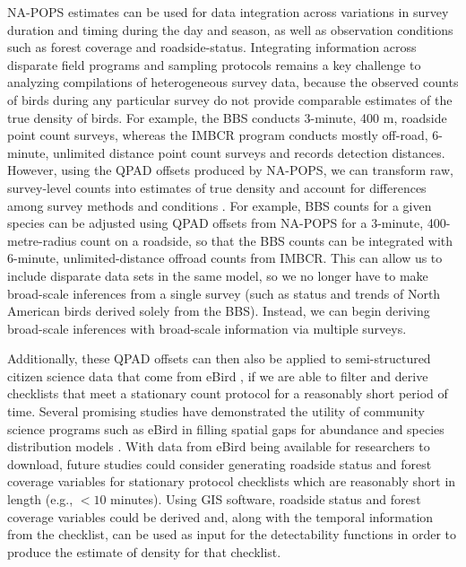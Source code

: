\par NA-POPS estimates can be used for data integration across variations in survey duration and timing during the day and season, as well as observation conditions such as forest coverage and roadside-status.
Integrating information across disparate field programs and sampling protocols remains a key challenge to analyzing compilations of heterogeneous survey data, because the observed counts of birds during any particular survey do not provide comparable estimates of the true density of birds.
For example, the BBS conducts 3-minute, 400 m, roadside point count surveys, whereas the IMBCR program conducts mostly off-road, 6-minute, unlimited distance point count surveys and records detection distances.
However, using the QPAD offsets produced by NA-POPS, we can transform raw, survey-level counts into estimates of true density and account for differences among survey methods and conditions \citep{stralberg_projecting_2015, solymos_lessons_2020}.
For example, BBS counts for a given species can be adjusted using QPAD offsets from NA-POPS for a 3-minute, 400-metre-radius count on a roadside, so that the BBS counts can be integrated with 6-minute, unlimited-distance offroad counts from IMBCR.
This can allow us to include disparate data sets in the same model, so we no longer have to make broad-scale inferences from a single survey (such as status and trends of North American birds derived solely from the BBS). Instead, we can begin deriving broad-scale inferences with broad-scale information via multiple surveys. 

\par Additionally, these QPAD offsets can then also be applied to semi-structured citizen science data that come from eBird \citep{sullivan_ebird_2014}, if we are able to filter and derive checklists that meet a stationary count protocol for a reasonably short period of time.
Several promising studies have demonstrated the utility of community science programs such as eBird in filling spatial gaps for abundance and species distribution models \citep{pacifici_integrating_2017, robinson_integrating_2020, joseph_data_2021}.
With data from eBird being available for researchers to download, future studies could consider generating roadside status and forest coverage variables for stationary protocol checklists which are reasonably short in length (e.g., $< 10$ minutes).
Using GIS software, roadside status and forest coverage variables could be derived and, along with the temporal information from the checklist, can be used as input for the detectability functions in order to produce the estimate of density for that checklist. 

